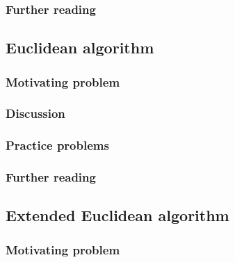 \subsubsection*{Further reading}

\subsection{Euclidean algorithm}

\subsubsection*{Motivating problem}







\subsubsection*{Discussion}

\subsubsection*{Practice problems}

\subsubsection*{Further reading}

\subsection{Extended Euclidean algorithm}

\subsubsection*{Motivating problem}






